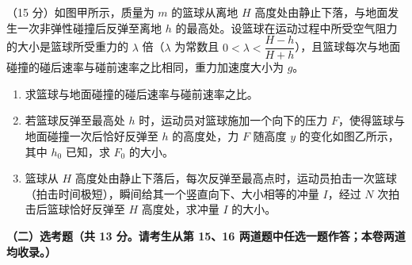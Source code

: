 \begin{question}
（15 分）如图甲所示，质量为 $m$ 的篮球从离地 $H$ 高度处由静止下落，与地面发生一次非弹性碰撞后反弹至离地 $h$ 的最高处。设篮球在运动过程中所受空气阻力的大小是篮球所受重力的 $\lambda$ 倍（$\lambda$ 为常数且 $0<\lambda<\dfrac{H-h}{H+h}$），且篮球每次与地面碰撞的碰后速率与碰前速率之比相同，重力加速度大小为 $g$。



\begin{enumerate}[leftmargin=2em, label=(\arabic*)]
  \item 求篮球与地面碰撞的碰后速率与碰前速率之比。
  \item 若篮球反弹至最高处 $h$ 时，运动员对篮球施加一个向下的压力 $F$，使得篮球与地面碰撞一次后恰好反弹至 $h$ 的高度处，力 $F$ 随高度 $y$ 的变化如图乙所示，其中 $h_{0}$ 已知，求 $F_{0}$ 的大小。
  \item 篮球从 $H$ 高度处由静止下落后，每次反弹至最高点时，运动员拍击一次篮球（拍击时间极短），瞬间给其一个竖直向下、大小相等的冲量 $I$，经过 $N$ 次拍击后篮球恰好反弹至 $H$ 高度处，求冲量 $I$ 的大小。
\end{enumerate}
\end{question}

\textbf{（二）选考题（共 13 分。请考生从第 15、16 两道题中任选一题作答；本卷两道均收录。）}

